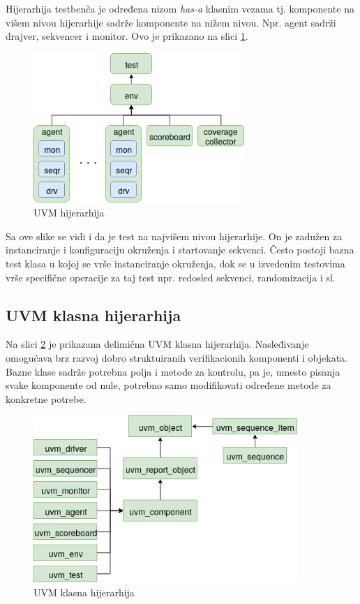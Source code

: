 Hijerarhija testbenča je određena nizom \emph{has-a} klasnim vezama tj.
komponente na višem nivou hijerarhije sadrže komponente na nižem nivou. Npr.
agent sadrži drajver, sekvencer i monitor. Ovo je prikazano na slici
\ref{fig:uvm_hierarchy}.\\

\begin{figure}[h!]
  \centering
  \includegraphics[width=80mm]{img/v5_uvm_hierarchy.png}
  \caption{UVM hijerarhija}
  \label{fig:uvm_hierarchy}
\end{figure}

Sa ove slike se vidi i da je test na najvišem nivou hijerarhije. On je zadužen
za instanciranje i konfiguraciju okruženja i startovanje sekvenci. Često postoji
bazna test klasa u kojoj se vrše instanciranje okruženja, dok se u izvedenim
testovima vrše specifične operacije za taj test npr. redosled sekvenci,
randomizacija i sl.


\subsection{UVM klasna hijerarhija}

Na slici \ref{fig:uvm_class_hierarchy} je prikazana delimična UVM klasna
hijerarhija.
Nasleđivanje omogućava brz razvoj dobro struktuiranih verifikacionih komponenti
i objekata. Bazne klase sadrže potrebna polja i metode za kontrolu, pa je,
umesto pisanja svake komponente od nule, potrebno samo modifikovati određene
metode za konkretne potrebe.\\

\begin{figure}[h!]
  \centering
  \includegraphics[width=100mm]{img/v5_uvm_class_hierarchy.png}
  \caption{UVM klasna hijerarhija}
  \label{fig:uvm_class_hierarchy}
\end{figure}

